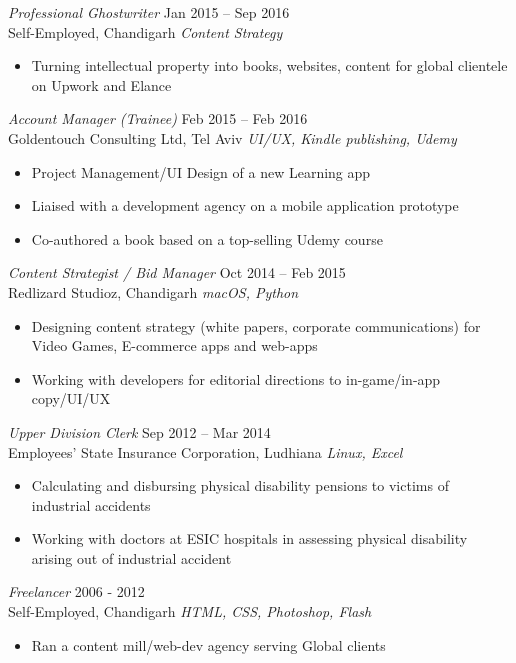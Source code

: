 \documentclass[margin, 10pt]{res} %
\begin{document}
\begin{resume}
\begin{itemize}
\end{itemize}

{\sl Professional Ghostwriter} \hfill Jan 2015 – Sep 2016 \\
Self-Employed, Chandigarh \hfill {\scriptsize \it Content Strategy}
\begin{itemize}
\item Turning intellectual property into books, websites, content for global clientele on Upwork and Elance
\end{itemize}

{\sl Account Manager (Trainee)} \hfill Feb 2015 – Feb 2016 \\
Goldentouch Consulting Ltd, Tel Aviv \hfill {\scriptsize \it UI/UX, Kindle publishing, Udemy} 
\begin{itemize}
\item Project Management/UI Design of a new Learning app
\item Liaised with a development agency on a mobile application prototype
\item Co-authored a book based on a top-selling Udemy course
\end{itemize}

{\sl Content Strategist / Bid Manager} \hfill Oct 2014 – Feb 2015 \\
Redlizard Studioz, Chandigarh \hfill {\scriptsize \it macOS, Python}
\begin{itemize}
\item Designing content strategy (white papers, corporate communications) for Video Games, E-commerce apps and web-apps
\item Working with developers for editorial directions to in-game/in-app copy/UI/UX
\end{itemize}

{\sl Upper Division Clerk} \hfill Sep 2012 – Mar 2014 \\
Employees' State Insurance Corporation, Ludhiana \hfill {\scriptsize \it Linux, Excel}
\begin{itemize}
\item Calculating and disbursing physical disability pensions to victims of industrial accidents
\item Working with doctors at ESIC hospitals in assessing physical disability arising out of industrial accident 
\end{itemize} 

{\sl Freelancer} \hfill 2006 - 2012 \\
Self-Employed, Chandigarh \hfill {\scriptsize \it HTML, CSS, Photoshop, Flash} 
\begin{itemize}
\item Ran a content mill/web-dev agency serving Global clients
\end{itemize}


\end{resume}
\end{document}
